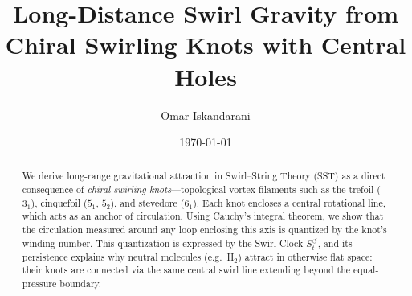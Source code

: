 \documentclass[11pt]{article}
\newcommand{\SwirlClock}{S_t^{\boldsymbol{\circlearrowleft}}}
\begin{document}
\title{Long-Distance Swirl Gravity from Chiral Swirling Knots with Central Holes}
\author{Omar Iskandarani}
\date{\today}
\maketitle

\begin{abstract}
We derive long-range gravitational attraction in Swirl--String Theory (SST) as a direct consequence of \emph{chiral swirling knots}---topological vortex filaments such as the trefoil ($3_1$), cinquefoil ($5_1$, $5_2$), and stevedore ($6_1$).
Each knot encloses a central rotational line, which acts as an anchor of circulation.
Using Cauchy's integral theorem, we show that the circulation measured around any loop enclosing this axis is quantized by the knot's winding number.
This quantization is expressed by the Swirl Clock $\SwirlClock$, and its persistence explains why neutral molecules (e.g.\ H$_2$) attract in otherwise flat space: their knots are connected via the same central swirl line extending beyond the equal-pressure boundary.
\end{abstract}



\end{document}
